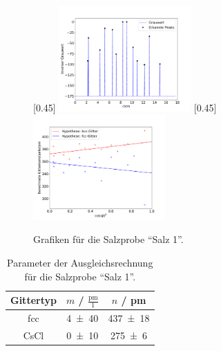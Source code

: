 \begin{figure}[h!]
  \centering
  [0.45\textwidth]{
  \centering
  \includegraphics[width=0.45\textwidth]{Auswertung/Grafiken/Salt_Peaks.pdf}
  }
  [0.45\textwidth]{
  \centering
  \includegraphics[width=0.45\textwidth]{Auswertung/Grafiken/Salt_Ausgleichsrechnung.pdf}
  }\\
  \label{Abb:Salz_Plots}
  \caption{Grafiken für die Salzprobe \enquote{Salz 1}.}
\end{figure}

\begin{table}[H]
  \centering
  \caption{Parameter der Ausgleichsrechnung für die Salzprobe \enquote{Salz 1}.}
  \label{Tab:Salz_Regression}
  \begin{tabular}{c | c c }
    \toprule
    Gittertyp &
    $m$ / $\frac{\mathrm{pm}}{1}$ &
    $n$ / pm \\
    \midrule
    fcc & \num{4(40)} & \num{437(18)} \\
    CsCl & \num{0(10)} & \num{275(6)} \\
    \bottomrule
  \end{tabular}
\end{table}


